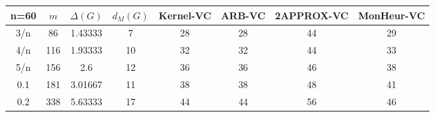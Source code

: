 \begin{tabular}{||c||ccc||cccc||}
 \hline \hline 
 n=60&$m$&$\Delta (G)$&$d_M(G)$& Kernel-VC & ARB-VC & 2APPROX-VC & MonHeur-VC\\ \hline \hline
3/n&86&1.43333&7&28&28&44&29\\
4/n&116&1.93333&10&32&32&44&33\\
5/n&156&2.6&12&36&36&46&38\\
0.1&181&3.01667&11&38&38&48&41\\
0.2&338&5.63333&17&44&44&56&46\\
\hline \end{tabular}

